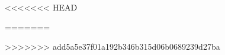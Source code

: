 \documentclass[12pt,a4paper]{report}
\begin{document}
	
	
	
%	
	
	\newpage
	
	
<<<<<<< HEAD
	
%		
=======
	\begin{appendix}
	\end{appendix}		
	
>>>>>>> add5a5e37f01a192b346b315d06b0689239d27ba
\end{document}
